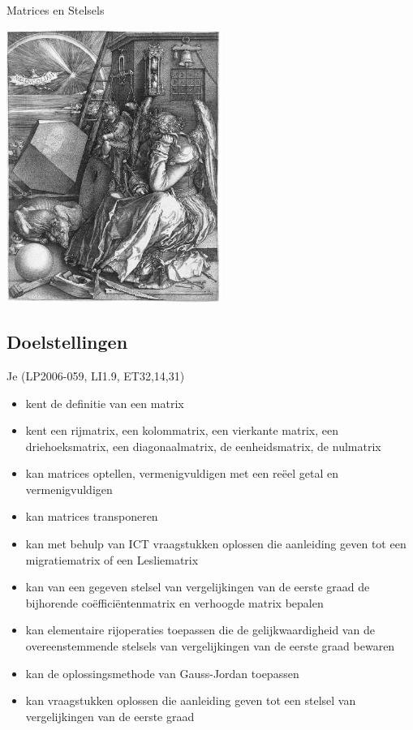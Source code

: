 \documentclass[12pt,twoside]{article}
\begin{document}
\thispagestyle{empty}
\begin{center}
  \begin{mdframed}
    \centering
    \fontsize{40}{60}\selectfont Matrices en Stelsels
  \end{mdframed}
  \includegraphics[width=7cm]{magicsquare}
\end{center}

\subsection*{Doelstellingen}
\begin{singlespacing}
  Je \hfill  {\scriptsize(LP2006-059, LI1.9, ET32,14,31)}
  \begin{itemize}
    \itemsep-0.2em
  \item kent de definitie van een matrix
  \item kent een rijmatrix, een kolommatrix, een vierkante matrix, een driehoeksmatrix, een diagonaalmatrix, de eenheidsmatrix, de nulmatrix
  \item kan matrices optellen, vermenigvuldigen met een reëel getal en vermenigvuldigen
  \item kan matrices transponeren
  \item kan met behulp van ICT vraagstukken oplossen die aanleiding geven tot een migratiematrix of een Lesliematrix
  \item kan van een gegeven stelsel van vergelijkingen van de eerste graad de bijhorende coëfficiëntenmatrix en verhoogde matrix bepalen
  \item kan elementaire rijoperaties toepassen die de gelijkwaardigheid van de overeenstemmende stelsels van vergelijkingen van de eerste graad bewaren
  \item kan de oplossingsmethode van Gauss-Jordan toepassen
  \item kan vraagstukken oplossen die aanleiding geven tot een stelsel van vergelijkingen van de eerste graad
  \end{itemize}
\end{singlespacing}
\end{document}
